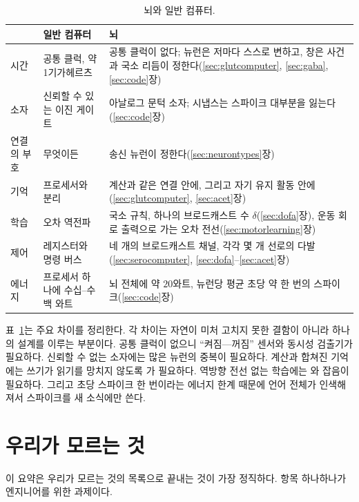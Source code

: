 \begin{table}[t]
\centering
\footnotesize
\setlength{\tabcolsep}{4pt}
\renewcommand{\arraystretch}{1.15}
\begin{tabular}{>{\raggedright}p{2.2cm}>{\raggedright}p{4.2cm}>{\raggedright\arraybackslash}p{6.6cm}}
\toprule
& 일반 컴퓨터 & 뇌 \\
\midrule
시간 & 공통 클럭, 약 1기가헤르츠 & 공통 클럭이 없다; 뉴런은 저마다 스스로 변하고, 창은 사건과 국소 리듬이 정한다(\ref{sec:glutcomputer}, \ref{sec:gaba}, \ref{sec:code}장) \\
소자 & 신뢰할 수 있는 이진 게이트 & 아날로그 문턱 소자; 시냅스는 스파이크 대부분을 잃는다(\ref{sec:code}장) \\
연결의 부호 & 무엇이든 & 송신 뉴런이 정한다(\ref{sec:neurontypes}장) \\
기억 & 프로세서와 분리 & 계산과 같은 연결 안에, 그리고 자기 유지 활동 안에(\ref{sec:glutcomputer}, \ref{sec:acet}장) \\
학습 & 오차 역전파 & 국소 규칙, 하나의 브로드캐스트 수 $\delta$(\ref{sec:dofa}장), 운동 회로 출력으로 가는 오차 전선(\ref{sec:motorlearning}장) \\
제어 & 레지스터와 명령 버스 & 네 개의 브로드캐스트 채널, 각각 몇 개 선로의 다발(\ref{sec:serocomputer}, \ref{sec:dofa}--\ref{sec:acet}장) \\
에너지 & 프로세서 하나에 수십--수백 와트 & 뇌 전체에 약 $20$와트, 뉴런당 평균 초당 약 한 번의 스파이크(\ref{sec:code}장) \\
\bottomrule
\end{tabular}
\caption{뇌와 일반 컴퓨터.}
\label{tab:computer}
\end{table}

표~\ref{tab:computer}는 주요 차이를 정리한다. 각 차이는 자연이 미처 고치지 못한 결함이 아니라 하나의 설계를 이루는 부분이다. 공통 클럭이 없으니 “켜짐---꺼짐” 센서와 동시성 검출기가 필요하다. 신뢰할 수 없는 소자에는 많은 뉴런의 중복이 필요하다. 계산과 합쳐진 기억에는 쓰기가 읽기를 망치지 않도록 가 필요하다. 역방향 전선 없는 학습에는 와 잡음이 필요하다. 그리고 초당 스파이크 한 번이라는 에너지 한계 때문에 언어 전체가 인색해져서 스파이크를 새 소식에만 쓴다.

\section{우리가 모르는 것}

이 요약은 우리가 모르는 것의 목록으로 끝내는 것이 가장 정직하다. 항목 하나하나가 엔지니어를 위한 과제이다.


